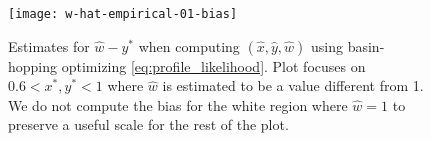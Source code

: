 \begin{figure}
\centering
\texttt{[image: w-hat-empirical-01-bias]}
\caption{
    Estimates for $\hat{w}-y^*$ when computing $(\hat{x}, \hat{y}, \hat{w})$ using basin-hopping \citep{Wales1997} optimizing \eqref{eq:profile_likelihood}.
    Plot focuses on $0.6 < x^*, y^* < 1$ where $\hat{w}$ is estimated to be a value different from 1.
    We do not compute the bias for the white region where $\hat{w}=1$ to preserve a useful scale for the rest of the plot.
}
\label{fig:bl-general-bias}
\end{figure}

